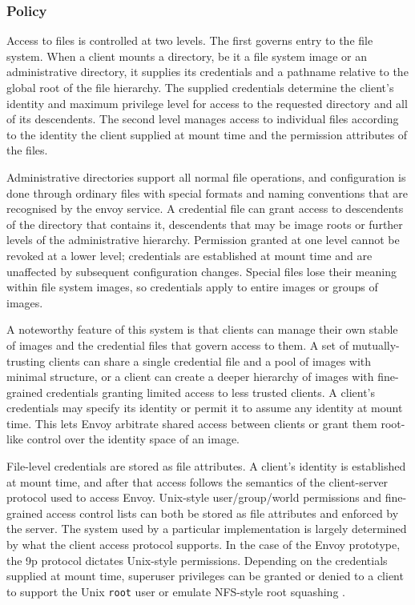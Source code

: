 \subsubsection{Policy}

Access to files is controlled at two levels. The first governs entry to the file system. When a client mounts a directory, be it a file system image or an administrative directory, it supplies its credentials and a pathname relative to the global root of the file hierarchy. The supplied credentials determine the client's identity and maximum privilege level for access to the requested directory and all of its descendents. The second level manages access to individual files according to the identity the client supplied at mount time and the permission attributes of the files.

Administrative directories support all normal file operations, and configuration is done through ordinary files with special formats and naming conventions that are recognised by the envoy service. A credential file can grant access to descendents of the directory that contains it, descendents that may be image roots or further levels of the administrative hierarchy. Permission granted at one level cannot be revoked at a lower level; credentials are established at mount time and are unaffected by subsequent configuration changes. Special files lose their meaning within file system images, so credentials apply to entire images or groups of images.

A noteworthy feature of this system is that clients can manage their own stable of images and the credential files that govern access to them. A set of mutually-trusting clients can share a single credential file and a pool of images with minimal structure, or a client can create a deeper hierarchy of images with fine-grained credentials granting limited access to less trusted clients. A client's credentials may specify its identity or permit it to assume any identity at mount time. This lets Envoy arbitrate shared access between clients or grant them root-like control over the identity space of an image.

File-level credentials are stored as file attributes. A client's identity is established at mount time, and after that access follows the semantics of the client-server protocol used to access Envoy. Unix-style user/group/world permissions and fine-grained access control lists can both be stored as file attributes and enforced by the server. The system used by a particular implementation is largely determined by what the client access protocol supports. In the case of the Envoy prototype, the 9p protocol dictates Unix-style permissions. Depending on the credentials supplied at mount time, superuser privileges can be granted or denied to a client to support the Unix \texttt{root} user or emulate NFS-style root squashing \cite{pawlowski}.

